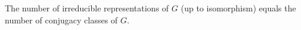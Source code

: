 The number of irreducible representations of $G$ (up to isomorphism) equals the number of conjugacy classes of $G$.
